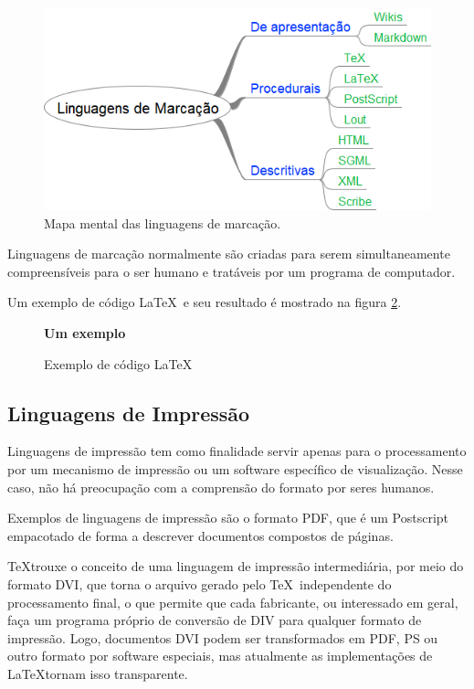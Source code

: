 \begin{figure}
    \centering
    \includegraphics[width=0.7\linewidth]{Images/MMlingmarkup}
    \caption[As linguagens de marcação]{Mapa mental das linguagens de marcação.}
    \label{fig:mmlingmarkup}
\end{figure}

Linguagens de marcação normalmente são criadas para serem simultaneamente compreensíveis para o ser humano e tratáveis por um programa de computador. 

Um exemplo de código \LaTeX\ e seu resultado é mostrado na figura \ref{fig:cod:latex:1}.

\begin{figure}[hbt]
\begin{LTXexample}[pos=b]
    \textbf{Um exemplo} 
\end{LTXexample}
\caption{Exemplo de código \LaTeX}
\label{fig:cod:latex:1}
\end{figure}


\subsection{Linguagens de Impressão}

Linguagens de impressão tem como finalidade servir apenas para o processamento por um mecanismo de impressão ou um software específico de visualização. Nesse caso, não há preocupação com a comprensão do formato por seres humanos.

Exemplos de linguagens de impressão são o formato PDF, que é um Postscript empacotado de forma a descrever documentos compostos de páginas.

\TeX  trouxe o conceito de uma linguagem de impressão intermediária, por meio do formato DVI, que torna o arquivo gerado pelo \TeX\  independente do processamento final, o que permite que cada fabricante, ou interessado em geral, faça um programa próprio de conversão de DIV para qualquer formato de impressão. Logo, documentos DVI podem ser transformados em PDF, PS ou outro formato por software especiais, mas atualmente as implementações de \LaTeX  tornam isso transparente.


